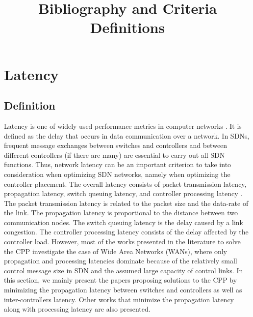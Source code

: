 \documentclass[a4paper,10pt]{article}
\title{Bibliography and Criteria Definitions}
\author{}
\begin{document}
\maketitle

\section{Latency}
\subsection{Definition}
Latency is one of widely used performance metrics in computer networks \cite{SiHa15}. It is defined as the delay that occurs in data communication over a network. In SDNs, frequent message exchanges between switches and controllers and between different controllers (if there are many) are essential to carry out all SDN functions. Thus, network latency can be an important criterion to take into consideration when optimizing SDN networks, namely when optimizing the controller placement. The overall latency consists of packet transmission latency, propagation latency, switch queuing latency, and controller processing latency \cite{WaZh17}. The packet transmission latency is related to the packet size and the data-rate of the link. The propagation latency is proportional to the distance between two communication nodes. The switch queuing latency is the delay caused by a link congestion. The controller processing latency consists of the delay affected by the controller load. However, most of the works presented in the literature to solve the CPP investigate the case of Wide Area Networks (WANs), where only propagation and processing latencies dominate because of the relatively small control message size in SDN and the assumed large capacity of control links. In this section, we mainly present the papers proposing solutions to the CPP by minimizing the propagation latency between switches and controllers as well as inter-controllers latency. Other works that minimize the propagation latency along with processing latency are also presented.


\end{document}
